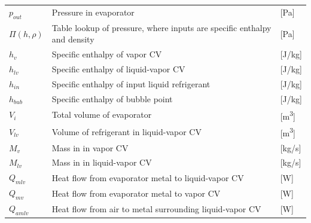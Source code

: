 \begin{center}
	\begin{tabular}{l p{10cm} l}
		$ p_{out} 	$     & Pressure in evaporator                                                   & [\si{Pa}]                         \\
		$\Pi(h,\rho) $   & Table lookup of pressure, where inputs are specific enthalpy and density & [\si{Pa}]                         \\
		$h_{v} $         & Specific enthalpy of vapor CV                                            & [\si{J}/\si{kg}]                  \\
		$h_{lv} $        & Specific enthalpy of liquid-vapor CV                                     & [\si{J}/\si{kg}]                  \\
		$h_{in} $        & Specific enthalpy of input liquid refrigerant                            & [\si{J}/\si{kg}]                  \\ %
		$h_{bub}$        & Specific enthalpy of bubble point                                        & [\si{J}/\si{kg}]                  \\
		$V_{i} $         & Total volume of evaporator                                               & [\si{m^3}]                        \\
		$V_{lv} $        & Volume of refrigerant in liquid-vapor CV                                 & [\si{m^3}]                        \\
		$M_{v}$          & Mass in	in vapor CV                                                     & [\si{kg}/\si{s}]                  \\
		$M_{lv}$         & Mass in	in liquid-vapor CV                                              & [\si{kg}/\si{s}]                  \\
		$Q_{mlv}$        & Heat flow from evaporator metal to liquid-vapor CV                       & [\si{W}]                          \\
		$Q_{mv}$         & Heat flow from evaporator metal to vapor CV                              & [\si{W}]                          \\
		$Q_{amlv}$       & Heat flow from air to metal surrounding liquid-vapor CV                  & [\si{W}]                          \\

\end{tabular}
\end{center}
